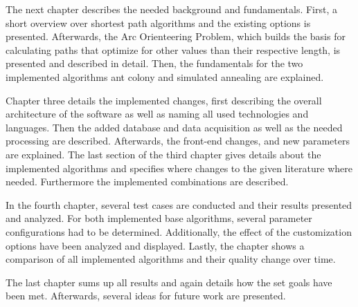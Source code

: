 The next chapter describes the needed background and fundamentals.
First, a short overview over shortest path algorithms and the existing options is presented.
Afterwards, the Arc Orienteering Problem, which builds the basis for calculating paths that optimize for other values than their respective length, is presented and described in detail.
Then, the fundamentals for the two implemented algorithms ant colony and simulated annealing are explained.

Chapter three details the implemented changes, first describing the overall architecture of the software as well as naming all used technologies and languages.
Then the added database and data acquisition as well as the needed processing are described.
Afterwards, the front-end changes, and new parameters are explained.
The last section of the third chapter gives details about the implemented algorithms and specifies where changes to the given literature where needed.
Furthermore the implemented combinations are described.

In the fourth chapter, several test cases are conducted and their results presented and analyzed.
For both implemented base algorithms, several parameter configurations had to be determined.
Additionally, the effect of the customization options have been analyzed and displayed. 
Lastly, the chapter shows a comparison of all implemented algorithms and their quality change over time.

The last chapter sums up all results and again details how the set goals have been met.
Afterwards, several ideas for future work are presented.








